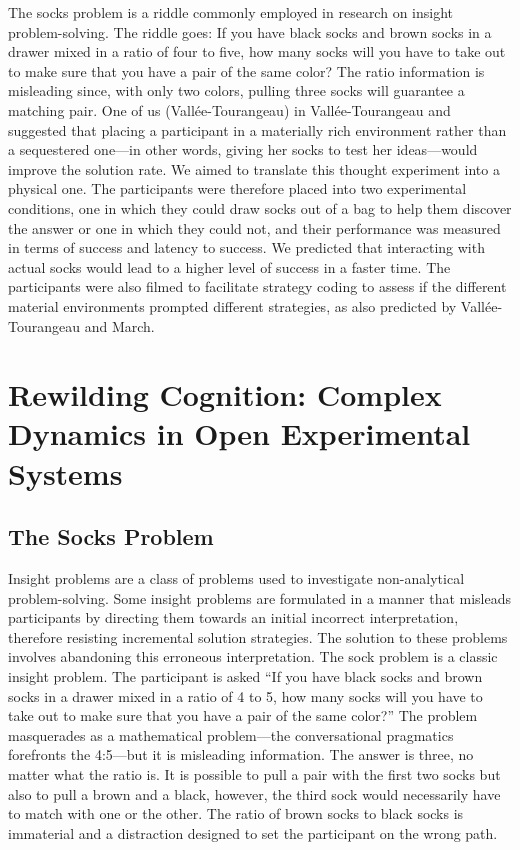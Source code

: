 \documentclass{article}
\begin{document}
The socks problem is a riddle commonly employed in research on insight problem-solving. The riddle goes: If you have black socks and brown socks in a drawer mixed in a ratio of four to five, how many socks will you have to take out to make sure that you have a pair of the same color? The ratio information is misleading since, with only two colors, pulling three socks will guarantee a matching pair. One of us (Vallée-Tourangeau) in Vallée-Tourangeau and \parencite{March2020} suggested that placing a participant in a materially rich environment rather than a sequestered one—in other words, giving her socks to test her ideas—would improve the solution rate. We aimed to translate this thought experiment into a physical one. The participants were therefore placed into two experimental conditions, one in which they could draw socks out of a bag to help them discover the answer or one in which they could not, and their performance was measured in terms of success and latency to success. We predicted that interacting with actual socks would lead to a higher level of success in a faster time. The participants were also filmed to facilitate strategy coding to assess if the different material environments prompted different strategies, as also predicted by Vallée-Tourangeau and March. 

\section{Rewilding Cognition: Complex Dynamics in Open Experimental Systems}

\subsection{The Socks Problem}

Insight problems are a class of problems used to investigate non-analytical problem-solving. Some insight problems are formulated in a manner that misleads participants by directing them towards an initial incorrect interpretation, therefore resisting incremental solution strategies. The solution to these problems involves abandoning this erroneous interpretation. The sock problem is a classic insight problem. The participant is asked “If you have black socks and brown socks in a drawer mixed in a ratio of 4 to 5, how many socks will you have to take out to make sure that you have a pair of the same color?” The problem masquerades as a mathematical problem—the conversational pragmatics forefronts the 4:5—but it is misleading information. The answer is three, no matter what the ratio is. It is possible to pull a pair with the first two socks but also to pull a brown and a black, however, the third sock would necessarily have to match with one or the other. The ratio of brown socks to black socks is immaterial and a distraction designed to set the participant on the wrong path. 
\end{document}
